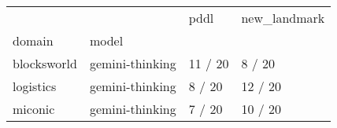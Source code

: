 \begin{tabular}{llll}
\toprule
 &  & pddl & new\_landmark \\
domain & model &  &  \\
\midrule
blocksworld & gemini-thinking & 11 / 20 & 8 / 20 \\
\cline{1-4}
logistics & gemini-thinking & 8 / 20 & 12 / 20 \\
\cline{1-4}
miconic & gemini-thinking & 7 / 20 & 10 / 20 \\
\cline{1-4}
\end{tabular}